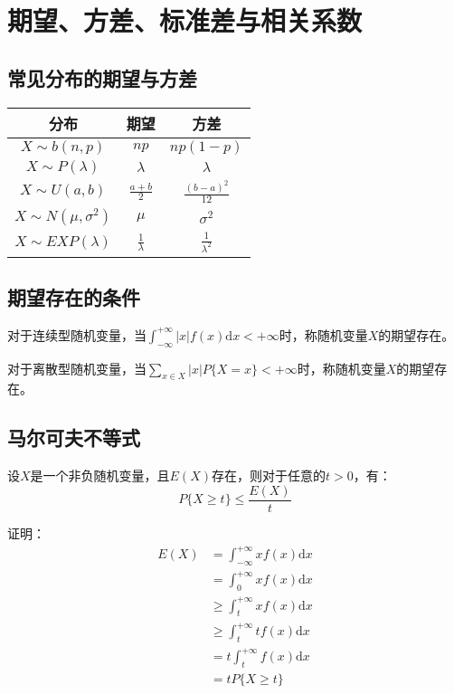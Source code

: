 \documentclass[a4paper,12pt]{ctexart}
\begin{document}
\section{期望、方差、标准差与相关系数}

\subsection{常见分布的期望与方差}

\begin{center}
	\begin{tabular}{|c|c|c|}
		\hline
		分布 & 期望 & 方差 \\
		\hline
		$X\sim b(n,p)$ & $np$ & $np(1-p)$ \\
		\hline
		$X\sim P(\lambda)$ & $\lambda$ & $\lambda$ \\
		\hline
		$X\sim U(a,b)$ & $\frac{a+b}{2}$ & $\frac{(b-a)^2}{12}$ \\
		\hline
		$X\sim N(\mu,\sigma^2)$ & $\mu$ & $\sigma^2$ \\
		\hline
		$X\sim EXP(\lambda)$ & $\frac{1}{\lambda}$ & $\frac{1}{\lambda^2}$ \\
		\hline
	\end{tabular}
\end{center}

\subsection{期望存在的条件}

对于连续型随机变量，当$\int_{-\infty}^{+\infty}|x|f(x)\mathrm{d}x < +\infty$时，称随机变量$X$的期望存在。

对于离散型随机变量，当$\sum_{x\in X}|x|P\{X = x\} < +\infty$时，称随机变量$X$的期望存在。

\subsection{马尔可夫不等式}

设$X$是一个非负随机变量，且$E(X)$存在，则对于任意的$t > 0$，有：
\begin{equation*}
	P\{X \geq t\} \leq \frac{E(X)}{t}
\end{equation*}

证明：
\begin{align*}
	E(X) &= \int_{-\infty}^{+\infty}xf(x)\mathrm{d}x \\
	&= \int_{0}^{+\infty}xf(x)\mathrm{d}x \\
	&\geq \int_{t}^{+\infty}xf(x)\mathrm{d}x \\
	&\geq \int_{t}^{+\infty}tf(x)\mathrm{d}x \\
	&= t\int_{t}^{+\infty}f(x)\mathrm{d}x \\
	&= tP\{X \geq t\}
\end{align*}
\end{document}
